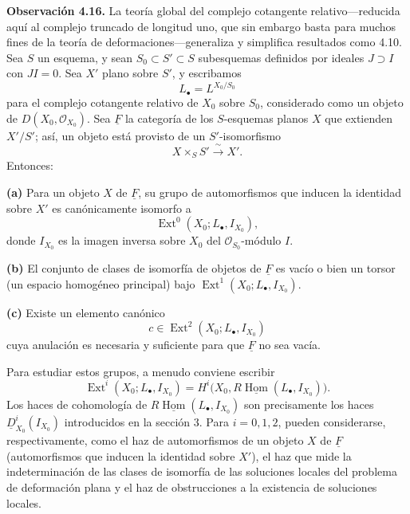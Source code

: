\par\medskip
\noindent\textbf{Observación 4.16.}
La teoría global del complejo cotangente relativo---reducida aquí al
complejo truncado de longitud uno, que sin embargo basta para muchos
fines de la teoría de deformaciones---generaliza y simplifica
resultados como 4.10. Sea $S$ un esquema, y sean
$S_0\subset S'\subset S$ subesquemas definidos por ideales
$J\supset I$ con $JI=0$. Sea $X'$ plano sobre $S'$, y escribamos
\[
L_\bullet=L^{X_0/S_0}
\]
para el complejo cotangente relativo de $X_0$ sobre $S_0$,
considerado como un objeto de $D(X_0,\mathcal O_{X_0})$. Sea
$\underline F$ la categoría de los $S$-esquemas planos $X$ que
extienden $X'/S'$; así, un objeto está provisto de un
$S'$-isomorfismo
\[
X\times_SS'\xrightarrow{\ \sim\ }X'.
\]
Entonces:

\smallskip
\noindent\textbf{(a)} Para un objeto $X$ de $\underline F$, su grupo
de automorfismos que inducen la identidad sobre $X'$ es canónicamente
isomorfo a
\[
\operatorname{Ext}^0(X_0;L_\bullet,I_{X_0}),
\]
donde $I_{X_0}$ es la imagen inversa sobre $X_0$ del
$\mathcal O_{S_0}$-módulo $I$.


\smallskip
\noindent\textbf{(b)} El conjunto de clases de isomorfía de objetos
de $\underline F$ es vacío o bien un torsor (un espacio homogéneo
principal) bajo $\operatorname{Ext}^1(X_0;L_\bullet,I_{X_0})$.

\smallskip
\noindent\textbf{(c)} Existe un elemento canónico
\[
c\in\operatorname{Ext}^2(X_0;L_\bullet,I_{X_0})
\]
cuya anulación es necesaria y suficiente para que $\underline F$ no
sea vacía.

Para estudiar estos grupos, a menudo conviene escribir
\[
\operatorname{Ext}^i(X_0;L_\bullet,I_{X_0})
=H^i\bigl(X_0,R\underline{\operatorname{Hom}}
  (L_\bullet,I_{X_0})\bigr).
\]
Los haces de cohomología de
$R\underline{\operatorname{Hom}}(L_\bullet,I_{X_0})$ son
precisamente los haces $\underline D^i_{X_0}(I_{X_0})$ introducidos
en la sección 3. Para $i=0,1,2$, pueden considerarse,
respectivamente, como el haz de automorfismos de un objeto $X$ de
$\underline F$ (automorfismos que inducen la identidad sobre $X'$),
el haz que mide la indeterminación de las clases de isomorfía de las
soluciones locales del problema de deformación plana y el haz de
obstrucciones a la existencia de soluciones locales.

